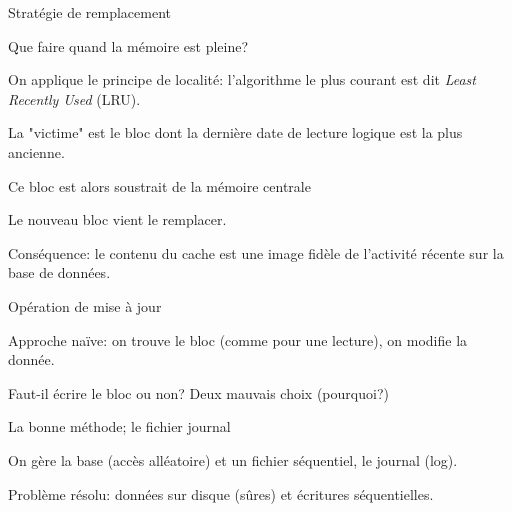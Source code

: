 \begin{frame}{Stratégie de remplacement}


Que faire quand la mémoire est pleine?

\vfill

On applique le principe de localité: l'algorithme le plus courant est dit \textit{Least Recently Used} (LRU).

\begin{redbullet}
  \item  La "victime" est le bloc dont la dernière date de lecture logique est la plus ancienne. 
  \item Ce bloc est alors soustrait de la mémoire centrale 
  \item  Le nouveau bloc vient le remplacer.
\end{redbullet}

\vfill

\begin{blocgauche}
\alert{Conséquence}: le contenu du cache est une image fidèle de l'activité \alert{récente} sur la base de données. 
\end{blocgauche}
\end{frame}


\begin{frame}{Opération de mise à jour}

Approche naïve: on trouve le bloc (comme pour une lecture), on modifie la donnée.

\vfill
 

\vfill
\begin{blocgauche}
Faut-il écrire le bloc ou non? Deux mauvais choix (pourquoi?)
\end{blocgauche}
\end{frame}


\begin{frame}{La bonne méthode; le fichier journal}

On gère la base (accès alléatoire) \alert{et} un fichier séquentiel, le \alert{journal} (log).

\medskip
 

\medskip
\begin{blocgauche}
Problème résolu: données sur disque (sûres) et écritures séquentielles.
\end{blocgauche}
\end{frame}

